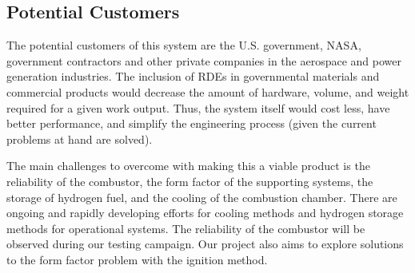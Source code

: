 \subsection{Potential Customers}

The potential customers of this system are the U.S. government, NASA, government contractors and other private companies in the aerospace and power generation industries. The inclusion of RDEs in governmental materials and commercial products would decrease the amount of hardware, volume, and weight required for a given work output. Thus, the system itself would cost less, have better performance, and simplify the engineering process (given the current problems at hand are solved). 

The main challenges to overcome with making this a viable product is the reliability of the combustor, the form factor of the supporting systems, the storage of hydrogen fuel, and the cooling of the combustion chamber. There are ongoing and rapidly developing efforts for cooling methods and hydrogen storage methods for operational systems. The reliability of the combustor will be observed during our testing campaign. Our project also aims to explore solutions to the form factor problem with the ignition method.